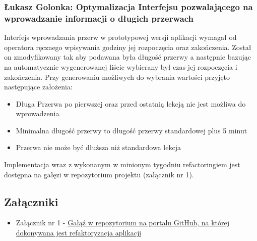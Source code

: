 \documentclass[12pt,a4paper,oneside]{article}
\theoremstyle{definition}
\numberwithin{equation}{section}
\begin{document}
\subsubsection{Łukasz Golonka: Optymalizacja Interfejsu pozwalającego na wprowadzanie informacji o długich przerwach}
Interfejs wprowadzania przerw w prototypowej wersji aplikacji wymagał od operatora ręcznego wpisywania godziny jej rozpoczęcia oraz zakończenia.
Został on zmodyfikowany tak aby podawana była długość przerwy a następnie bazując na automatycznie wygenerowanej liście wybierany był czas jej rozpoczęcia i zakończenia.
Przy generowaniu możliwych do wybrania wartości przyjęto następujące założenia:
\begin{itemize}
	\item Długa Przerwa po pierwszej oraz przed ostatnią lekcją nie jest możliwa do wprowadzenia
	\item Minimalna długość przerwy to długość przerwy standardowej plus 5 minut
	\item Przerwa nie może być dłuższa niż standardowa lekcja
\end{itemize}
Implementacja wraz z wykonanym w minionym tygodniu refactoringiem jest dostępna na gałęzi w repozytorium projektu (załącznik nr 1).


\subsection{Załączniki}
\begin{itemize}
	\item Załącznik nr 1 - \href{https://github.com/lukaszgo1/engineering_project_2022/tree/mvp}{Gałąź w repozytorium na portalu GitHub, na której dokonywana jest refaktoryzacja aplikacji}
\end{itemize}



\renewcommand\refname{Literatura (jeżeli wymagana)}

\end{document}
